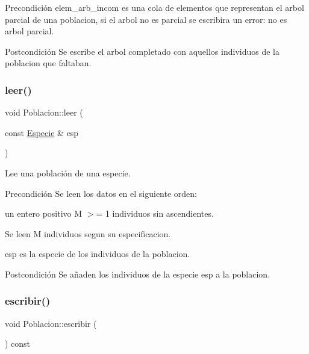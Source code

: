 \begin{DoxyPrecond}{Precondición}
elem\+\_\+arb\+\_\+incom es una cola de elementos que representan el arbol parcial de una poblacion, si el arbol no es parcial se escribira un error\+: \textquotesingle{}no es arbol parcial\textquotesingle{}. 
\end{DoxyPrecond}
\begin{DoxyPostcond}{Postcondición}
Se escribe el arbol completado con aquellos individuos de la poblacion que faltaban. 
\end{DoxyPostcond}
\mbox{\label{class_poblacion_a94a32410a0d2b2066b0d7203efbf673f}} 
\subsubsection{\texorpdfstring{leer()}{leer()}}
{\footnotesize\ttfamily void Poblacion\+::leer (\begin{DoxyParamCaption}\item[{const \hyperlink{class_especie}{Especie} \&}]{esp }\end{DoxyParamCaption})}



Lee una población de una especie. 

\begin{DoxyPrecond}{Precondición}
Se leen los datos en el siguiente orden\+:
\begin{DoxyEnumerate}
\item un entero positivo M $>$= 1 individuos sin ascendientes.
\item Se leen M individuos segun su especificacion.
\end{DoxyEnumerate}
\end{DoxyPrecond}
esp es la especie de los individuos de la poblacion.

\begin{DoxyPostcond}{Postcondición}
Se añaden los individuos de la especie esp a la poblacion. 
\end{DoxyPostcond}
\mbox{\label{class_poblacion_a2b14ac61ad3c062ce8d9c30cdee05923}} 
\subsubsection{\texorpdfstring{escribir()}{escribir()}}
{\footnotesize\ttfamily void Poblacion\+::escribir (\begin{DoxyParamCaption}{ }\end{DoxyParamCaption}) const}



